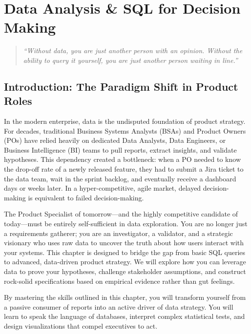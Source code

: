 \chapter{Data Analysis \& SQL for Decision
Making}\label{data-analysis-sql-for-decision-making}

\begin{quote}
\emph{``Without data, you are just another person with an opinion.
Without the ability to query it yourself, you are just another person
waiting in line.''}
\end{quote}

\section{Introduction: The Paradigm Shift in Product
Roles}\label{introduction-the-paradigm-shift-in-product-roles}

In the modern enterprise, data is the undisputed foundation of product
strategy. For decades, traditional Business Systems Analysts (BSAs) and
Product Owners (POs) have relied heavily on dedicated Data Analysts,
Data Engineers, or Business Intelligence (BI) teams to pull reports,
extract insights, and validate hypotheses. This dependency created a
bottleneck: when a PO needed to know the drop-off rate of a newly
released feature, they had to submit a Jira ticket to the data team,
wait in the sprint backlog, and eventually receive a dashboard days or
weeks later. In a hyper-competitive, agile market, delayed
decision-making is equivalent to failed decision-making.

The Product Specialist of tomorrow---and the highly competitive
candidate of today---must be entirely self-sufficient in data
exploration. You are no longer just a requirements gatherer; you are an
investigator, a validator, and a strategic visionary who uses raw data
to uncover the truth about how users interact with your systems. This
chapter is designed to bridge the gap from basic SQL queries to
advanced, data-driven product strategy. We will explore how you can
leverage data to prove your hypotheses, challenge stakeholder
assumptions, and construct rock-solid specifications based on empirical
evidence rather than gut feelings.

By mastering the skills outlined in this chapter, you will transform
yourself from a passive consumer of reports into an active driver of
data strategy. You will learn to speak the language of databases,
interpret complex statistical tests, and design visualizations that
compel executives to act.

